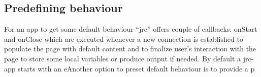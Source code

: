\documentclass[twocolumn,10pt]{article}
\begin{document}
\subsection{Predefining behaviour}

For an app to get some default behaviour ``jrc'' offers couple of callbacks: onStart and onClose which are executed whenever a new connection is established to populate the page with default content and to finalize user's interaction with the page to store some local variables or produce output if needed. By default a jrc-app starts with an eAnother option to preset default behaviour is to provide a p

\begin{small} 
\balance
%
\end{small}
\end{document}
